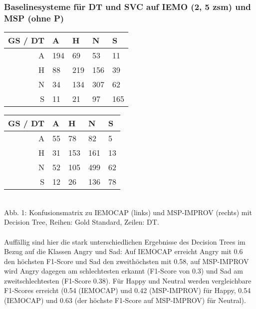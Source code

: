 \documentclass{article} %
\begin{document}
\subsubsection{Baselinesysteme für DT und SVC auf IEMO (2, 5 zsm) und MSP (ohne P)}

\begin{tabular}{|r|llll|}
\hline
GS / DT & A & H & N & S \\
\hline
A & 194 & 69 & 53 & 11 \\
H & 88 & 219 & 156 & 39 \\
N & 34 & 134 & 307 & 62 \\
S & 11 & 21 & 97 & 165 \\
\hline
\end{tabular}
\begin{tabular}{|r|llll|}
\hline
GS / DT & A & H & N & S \\
\hline
A & 55 & 78 & 82 & 5 \\
H & 31 & 153 & 161 & 13 \\
N & 52 & 105 & 499 & 62 \\
S & 12 & 26 & 136 & 78 \\
\hline
\end{tabular} \\

Abb. 1: Konfusionsmatrix zu IEMOCAP (links) und MSP-IMPROV (rechts) mit Decision Tree, Reihen: Gold Standard, Zeilen: DT. \\ \\
Auffällig sind hier die stark unterschiedlichen Ergebnisse des Decision Trees im Bezug auf die Klassen Angry und Sad: Auf IEMOCAP erreicht Angry mit 0.6 den höchsten F1-Score und Sad den zweithöchsten mit 0.58, auf MSP-IMPROV wird Angry dagegen am schlechtesten erkannt (F1-Score von 0.3) und Sad am zweitschlechtesten (F1-Score 0.38). Für Happy und Neutral werden vergleichbare F1-Scores erreicht (0.54 (IEMOCAP) und 0.42 (MSP-IMPROV) für Happy, 0.54 (IEMOCAP) und 0.63 (der höchste F1-Score auf MSP-IMPROV) für Neutral). 
\end{document}
